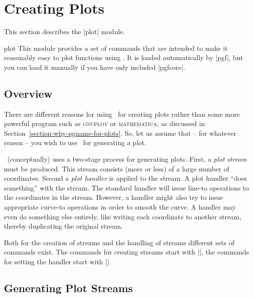 %
%
%


\section{Creating Plots}
\label{section-plots}

This section describes the |plot| module.

\begin{pgfmodule}{plot}
    This module provides a set of commands that are intended to make it
    reasonably easy to plot functions using \pgfname. It is loaded
    automatically by |pgf|, but you can load it manually if you have only
    included |pgfcore|.
\end{pgfmodule}


\subsection{Overview}

There are different reasons for using \pgfname\ for creating plots rather than
some more powerful program such as \textsc{gnuplot} or \textsc{mathematica}, as
discussed in Section~\ref{section-why-pgname-for-plots}. So, let us assume that
-- for whatever reason -- you wish to use \pgfname\ for generating a plot.

\pgfname\ (conceptually) uses a two-stage process for generating plots. First,
a \emph{plot stream} must be produced. This stream consists (more or less) of a
large number of coordinates. Second a \emph{plot handler} is applied to the
stream. A plot handler ``does something'' with the stream. The standard handler
will issue line-to operations to the coordinates in the stream. However, a
handler might also try to issue appropriate curve-to operations in order to
smooth the curve. A handler may even do something else entirely, like writing
each coordinate to another stream, thereby duplicating the original stream.

Both for the creation of streams and the handling of streams different sets of
commands exist. The commands for creating streams start with |\pgfplotstream|,
the commands for setting the handler start with |\pgfplothandler|.


\subsection{Generating Plot Streams}

